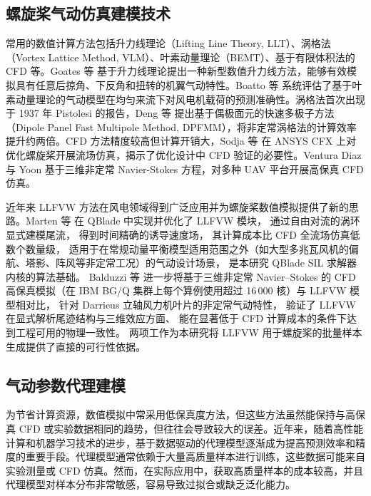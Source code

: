 \subsection{螺旋桨气动仿真建模技术}

常用的数值计算方法包括升力线理论（Lifting Line Theory, LLT）、涡格法（Vortex Lattice Method, VLM）、叶素动量理论（BEMT）、基于有限体积法的 CFD 等。Goates 等\cite{Goates2022} 基于升力线理论提出一种新型数值升力线方法，能够有效模拟具有任意后掠角、下反角和扭转的机翼气动特性。Boatto 等\cite{Boatto2023} 系统评估了基于叶素动量理论的气动模型在均匀来流下对风电机载荷的预测准确性。涡格法首次出现于 1937 年 Pistolesi 的报告\cite{Pistolesi1937}，Deng 等\cite{DengCJA2021} 提出基于偶极面元的快速多极子方法（Dipole Panel Fast Multipole Method, DPFMM），将非定常涡格法的计算效率提升约两倍。CFD 方法精度较高但计算开销大，Sodja 等\cite{Sodja2012} 在 ANSYS CFX 上对优化螺旋桨开展流场仿真，揭示了优化设计中 CFD 验证的必要性。Ventura Diaz 与 Yoon\cite{Ventura2018} 基于三维非定常 Navier-Stokes 方程，对多种 UAV 平台开展高保真 CFD 仿真。

近年来 LLFVW 方法在风电领域得到广泛应用并为螺旋桨数值模拟提供了新的思路。Marten 等\cite{Marten2016} 在 QBlade 中实现并优化了 LLFVW 模块，
通过自由对流的涡环显式建模尾流，
得到时间精确的诱导速度场，
其计算成本比 CFD 全流场仿真低数个数量级，
适用于在常规动量平衡模型适用范围之外（如大型多兆瓦风机的偏航、塔影、阵风等非定常工况）的气动设计场景，
是本研究 QBlade SIL 求解器内核的算法基础。
Balduzzi 等\cite{Balduzzi2018} 进一步将基于三维非定常 Navier--Stokes 的 CFD 高保真模拟（在 IBM BG/Q 集群上每个算例使用超过 16\,000 核）与 LLFVW 模型相对比，
针对 Darrieus 立轴风力机叶片的非定常气动特性，
验证了 LLFVW 在显式解析尾迹结构与三维效应方面、
能在显著低于 CFD 计算成本的条件下达到工程可用的物理一致性。
两项工作为本研究将 LLFVW 用于螺旋桨的批量样本生成提供了直接的可行性依据。

\subsection{气动参数代理建模}

为节省计算资源，数值模拟中常采用低保真度方法，但这些方法虽然能保持与高保真 CFD 或实验数据相同的趋势，但往往会导致较大的误差。近年来，随着高性能计算和机器学习技术的进步，基于数据驱动的代理模型逐渐成为提高预测效率和精度的重要手段。代理模型通常依赖于大量高质量样本进行训练，这些数据可能来自实验测量或 CFD 仿真。然而，在实际应用中，获取高质量样本的成本较高，并且代理模型对样本分布非常敏感，容易导致过拟合或缺乏泛化能力。

